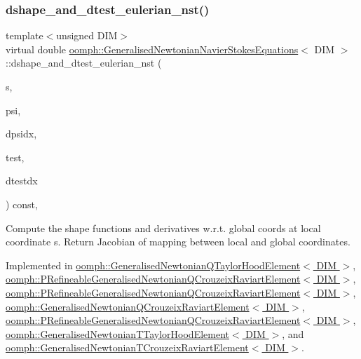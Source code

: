 \subsubsection{\texorpdfstring{dshape\+\_\+and\+\_\+dtest\+\_\+eulerian\+\_\+nst()}{dshape\_and\_dtest\_eulerian\_nst()}}
{\footnotesize\ttfamily template$<$unsigned D\+IM$>$ \\
virtual double \hyperlink{classoomph_1_1GeneralisedNewtonianNavierStokesEquations}{oomph\+::\+Generalised\+Newtonian\+Navier\+Stokes\+Equations}$<$ D\+IM $>$\+::dshape\+\_\+and\+\_\+dtest\+\_\+eulerian\+\_\+nst (\begin{DoxyParamCaption}\item[{const \hyperlink{classoomph_1_1Vector}{Vector}$<$ double $>$ \&}]{s,  }\item[{\hyperlink{classoomph_1_1Shape}{Shape} \&}]{psi,  }\item[{\hyperlink{classoomph_1_1DShape}{D\+Shape} \&}]{dpsidx,  }\item[{\hyperlink{classoomph_1_1Shape}{Shape} \&}]{test,  }\item[{\hyperlink{classoomph_1_1DShape}{D\+Shape} \&}]{dtestdx }\end{DoxyParamCaption}) const\hspace{0.3cm}{\ttfamily [protected]}, {}}



Compute the shape functions and derivatives w.\+r.\+t. global coords at local coordinate s. Return Jacobian of mapping between local and global coordinates. 



Implemented in \hyperlink{classoomph_1_1GeneralisedNewtonianQTaylorHoodElement_a0a9108e22aaa3d647f58929e19b488a0}{oomph\+::\+Generalised\+Newtonian\+Q\+Taylor\+Hood\+Element$<$ D\+I\+M $>$}, \hyperlink{classoomph_1_1PRefineableGeneralisedNewtonianQCrouzeixRaviartElement_a4d78303b555e3453b5dc92d25ce60c4c}{oomph\+::\+P\+Refineable\+Generalised\+Newtonian\+Q\+Crouzeix\+Raviart\+Element$<$ D\+I\+M $>$}, \hyperlink{classoomph_1_1PRefineableGeneralisedNewtonianQCrouzeixRaviartElement_a2524fa4ced356156df1882df4b3d1b91}{oomph\+::\+P\+Refineable\+Generalised\+Newtonian\+Q\+Crouzeix\+Raviart\+Element$<$ D\+I\+M $>$}, \hyperlink{classoomph_1_1GeneralisedNewtonianQCrouzeixRaviartElement_a815dca7d5b556835865c7691e547bc37}{oomph\+::\+Generalised\+Newtonian\+Q\+Crouzeix\+Raviart\+Element$<$ D\+I\+M $>$}, \hyperlink{classoomph_1_1PRefineableGeneralisedNewtonianQCrouzeixRaviartElement_a4cc8b7e4932fe27129f5e6b4dcba07dc}{oomph\+::\+P\+Refineable\+Generalised\+Newtonian\+Q\+Crouzeix\+Raviart\+Element$<$ D\+I\+M $>$}, \hyperlink{classoomph_1_1GeneralisedNewtonianTTaylorHoodElement_a3efc1cebd25ebbe9d2a00b2ca6bda6cf}{oomph\+::\+Generalised\+Newtonian\+T\+Taylor\+Hood\+Element$<$ D\+I\+M $>$}, and \hyperlink{classoomph_1_1GeneralisedNewtonianTCrouzeixRaviartElement_a772e1572fb598a309aaf35b5991d66c3}{oomph\+::\+Generalised\+Newtonian\+T\+Crouzeix\+Raviart\+Element$<$ D\+I\+M $>$}.




